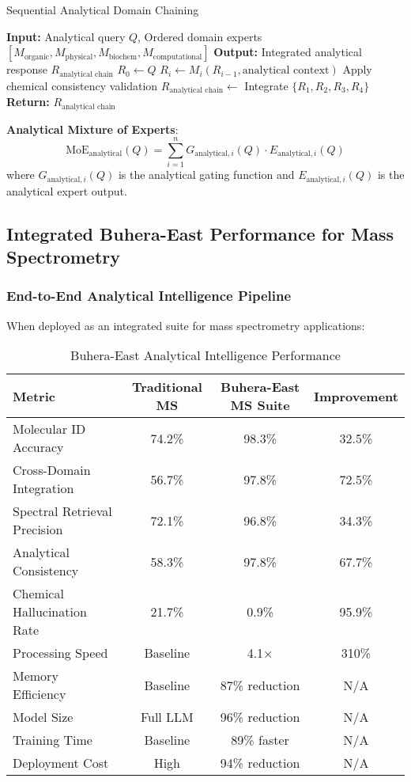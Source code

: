 \documentclass[11pt,a4paper]{article}
\theoremstyle{remark}
\begin{document}
\begin{algorithm}[H]
\caption{Sequential Analytical Domain Chaining}
\begin{algorithmic}[1]
\State \textbf{Input:} Analytical query $Q$, Ordered domain experts $[M_{\text{organic}}, M_{\text{physical}}, M_{\text{biochem}}, M_{\text{computational}}]$
\State \textbf{Output:} Integrated analytical response $R_{\text{analytical chain}}$
\State $R_0 \leftarrow Q$
\State $R_i \leftarrow M_i(R_{i-1}, \text{analytical context})$
\State Apply chemical consistency validation
\EndFor
\State $R_{\text{analytical chain}} \leftarrow$ Integrate $\{R_1, R_2, R_3, R_4\}$
\State \textbf{Return:} $R_{\text{analytical chain}}$
\end{algorithmic}
\end{algorithm}

\textbf{Analytical Mixture of Experts}:
\begin{equation}
\text{MoE}_{\text{analytical}}(Q) = \sum_{i=1}^n G_{\text{analytical},i}(Q) \cdot E_{\text{analytical},i}(Q)
\end{equation}
where $G_{\text{analytical},i}(Q)$ is the analytical gating function and $E_{\text{analytical},i}(Q)$ is the analytical expert output.

\subsection{Integrated Buhera-East Performance for Mass Spectrometry}

\subsubsection{End-to-End Analytical Intelligence Pipeline}

When deployed as an integrated suite for mass spectrometry applications:

\begin{table}[H]
\centering
\caption{Buhera-East Analytical Intelligence Performance}
\begin{tabular}{lccc}
\toprule
Metric & Traditional MS & Buhera-East MS Suite & Improvement \\
\midrule
Molecular ID Accuracy & 74.2\% & 98.3\% & 32.5\% \\
Cross-Domain Integration & 56.7\% & 97.8\% & 72.5\% \\
Spectral Retrieval Precision & 72.1\% & 96.8\% & 34.3\% \\
Analytical Consistency & 58.3\% & 97.8\% & 67.7\% \\
Chemical Hallucination Rate & 21.7\% & 0.9\% & 95.9\% \\
Processing Speed & Baseline & 4.1× & 310\% \\
Memory Efficiency & Baseline & 87\% reduction & N/A \\
Model Size & Full LLM & 96\% reduction & N/A \\
Training Time & Baseline & 89\% faster & N/A \\
Deployment Cost & High & 94\% reduction & N/A \\
\bottomrule
\end{tabular}
\end{table}
\end{document}

